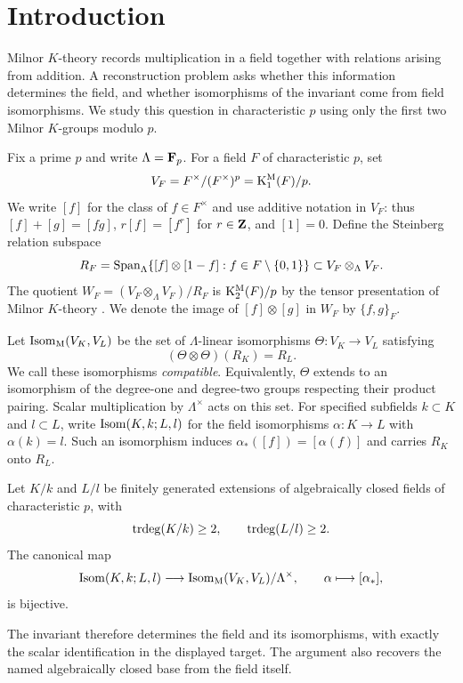 \section{Introduction}\label{sec:introduction}

Milnor $K$-theory records multiplication in a field together with relations
arising from addition. A reconstruction problem asks whether this
information determines the field, and whether isomorphisms of the
invariant come from field isomorphisms. We study this question in
characteristic $p$ using only the first two Milnor $K$-groups modulo $p$.

Fix a prime $p$ and write $\Lambda=\mathbf F_p$. For a field $F$ of
characteristic $p$, set
\[
 V_F=F^\times/(F^\times)^p=\mathrm K^{\mathrm M}_1(F)/p.
\]
We write $[f]$ for the class of $f\in F^\times$ and use additive
notation in $V_F$: thus $[f]+[g]=[fg]$, $r[f]=[f^r]$ for
$r\in\mathbf Z$, and $[1]=0$. Define the Steinberg relation subspace
\[
 R_F=\operatorname{Span}_{\Lambda}
       \{[f]\otimes[1-f]:f\in F\setminus\{0,1\}\}
       \subset V_F\otimes_{\Lambda}V_F.
\]
The quotient $W_F=(V_F\otimes_{\Lambda}V_F)/R_F$ is
$\mathrm K^{\mathrm M}_2(F)/p$ by the tensor presentation of Milnor $K$-theory
\cite[Section~1]{Milnor1970}. We denote the image of
$[f]\otimes[g]$ in $W_F$ by $\{f,g\}_F$.

Let $\operatorname{Isom}_{\mathrm M}(V_K,V_L)$ be the set of
$\Lambda$-linear isomorphisms $\Theta:V_K\to V_L$ satisfying
\[
                 (\Theta\otimes\Theta)(R_K)=R_L.
\]
We call these isomorphisms \emph{compatible}.
Equivalently, $\Theta$ extends to an isomorphism of the degree-one and
degree-two groups respecting their product pairing. Scalar multiplication
by $\Lambda^\times$ acts on this set. For specified subfields
$k\subset K$ and $l\subset L$, write $\operatorname{Isom}(K,k;L,l)$ for the
field isomorphisms $\alpha:K\to L$ with $\alpha(k)=l$.
Such an isomorphism induces $\alpha_*([f])=[\alpha(f)]$ and
carries $R_K$ onto $R_L$.

\begin{theorem}\label{thm:main}
Let $K/k$ and $L/l$ be finitely generated extensions of algebraically
closed fields of characteristic $p$, with
\[
              \operatorname{trdeg}(K/k)\ge2,\qquad \operatorname{trdeg}(L/l)\ge2.
\]
The canonical map
\[
 \operatorname{Isom}(K,k;L,l)\longrightarrow
 \operatorname{Isom}_{\mathrm M}(V_K,V_L)/\Lambda^\times,
 \qquad \alpha\longmapsto[\alpha_*],
\]
is bijective.
\end{theorem}

The invariant therefore determines the field and its isomorphisms, with
exactly the scalar identification in the displayed target. The argument
also recovers the named algebraically closed base from the field itself.

